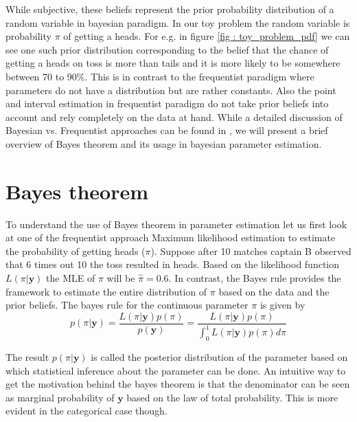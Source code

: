 While subjective, these beliefs represent the prior probability distribution of a random variable in bayesian paradigm. In our toy problem the random variable is probability $\pi$ of getting a heads. For e.g. in figure \ref{fig : toy_problem_pdf} we can see one such prior distribution corresponding to the belief that the chance of getting a heads on toss is more than tails and it is more likely to be somewhere between 70 to 90\%. This is in contrast to the frequentist paradigm where parameters do not have a distribution but are rather constants. Also the point and interval estimation in frequentist paradigm do not take prior beliefs into account and rely completely on the data at hand. While a detailed discussion of Bayesian vs. Frequentist approaches can be found in \cite{lesaffre_bayesian_2012}, we will present a brief overview of Bayes theorem and its usage in bayesian parameter estimation.

\section{Bayes theorem}
\label{sec : bayes_theorem}
To understand the use of Bayes theorem in parameter estimation let us first look at one of the frequentist approach Maximum likelihood estimation to estimate the probability of getting heads ($\pi$). Suppose after 10 matches captain B observed that 6 times out 10 the toss resulted in heads. Based on the likelihood function $L(\pi|\boldsymbol{y})$ the MLE of $\pi$ will be $\hat{\pi} = 0.6$. In contrast, the Bayes rule provides the framework to estimate the entire distribution of $\pi$ based on the data and the prior beliefs. The bayes rule for the continuous parameter $\pi$ is given by\\

\begin{equation}
\label{eq : bayes_rule}
p(\pi|\boldsymbol{y}) = \dfrac{L(\pi|\boldsymbol{y})p(\pi)}{p(\boldsymbol{y})} = \dfrac{L(\pi|\boldsymbol{y})p(\pi)}{\int_{0}^{1}L(\pi|\boldsymbol{y})p(\pi)d\pi}
\end{equation}

The result $p(\pi|\boldsymbol{y})$ is called the posterior distribution of the parameter based on which statistical inference about the parameter can be done. An intuitive way to get the motivation behind the bayes theorem is that the denominator can be seen as marginal probability of $\boldsymbol{y}$ based on the law of total probability. This is more evident in the categorical case though. 

